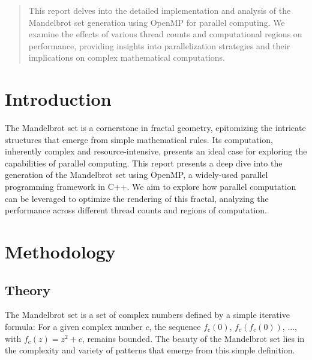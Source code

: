 \documentclass[11pt]{article}
\begin{document}
    
    \maketitle
    \thispagestyle{empty}
    \newpage

    \begin{abstract}
        This report delves into the detailed implementation and analysis of the Mandelbrot set generation using OpenMP for parallel computing. We examine the effects of various thread counts and computational regions on performance, providing insights into parallelization strategies and their implications on complex mathematical computations.
    \end{abstract}

    \tableofcontents
    
    \newpage
    
    \section{Introduction}
The Mandelbrot set is a cornerstone in fractal geometry, epitomizing the intricate structures that emerge from simple mathematical rules. Its computation, inherently complex and resource-intensive, presents an ideal case for exploring the capabilities of parallel computing. This report presents a deep dive into the generation of the Mandelbrot set using OpenMP, a widely-used parallel programming framework in C++. We aim to explore how parallel computation can be leveraged to optimize the rendering of this fractal, analyzing the performance across different thread counts and regions of computation.

\section{Methodology}

\subsection{Theory}
The Mandelbrot set is a set of complex numbers defined by a simple iterative formula: For a given complex number \( c \), the sequence \( f_{c}(0) \), \( f_{c}(f_{c}(0)) \), ..., with \( f_{c}(z) = z^2 + c \), remains bounded. The beauty of the Mandelbrot set lies in the complexity and variety of patterns that emerge from this simple definition.
\end{document}
